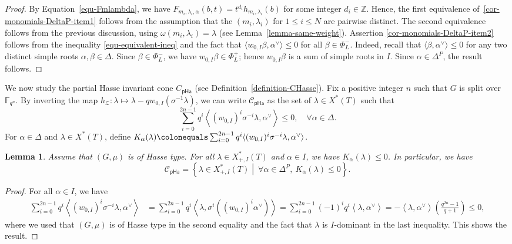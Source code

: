 \documentclass[11pt]{amsart}
\numberwithin{equation}{section}
\newtheorem{lemma}[theorem]{Lemma}
\theoremstyle{definition}
\theoremstyle{remark}
\newcommand{\pha}{\mathsf{pHa}}
\newcommand{\Ccal}{{\mathcal C}}
\newcommand{\Zcal}{{\mathcal Z}}
\newcommand{\FF}{\mathbb{F}}
\newcommand{\ZZ}{\mathbb{Z}}
\newcommand{\relmiddle}[1]{\mathrel{}\middle#1\mathrel{}}
\begin{document}
\begin{proof}
By Equation~\eqref{equ-Fmlambda}, we have $F_{m_i,\lambda_i,\alpha}(b,t)=t^{d_i} h_{m_i,\lambda_i}(b)$ for some integer $d_i\in \ZZ$. 
Hence, the first equivalence of~\eqref{cor-monomials-DeltaP-item1} follows from the assumption that the $(m_i,\lambda_i)$ for $1\leq i \leq N$ are pairwise distinct. 
The second equivalence follows from the previous discussion, using $\omega(m_i,\lambda_i)=\lambda$ (see Lemma~\ref{lemma-same-weight}). Assertion \eqref{cor-monomials-DeltaP-item2} follows from the inequality \eqref{equ-equivalent-ineq} and the fact that $\langle w_{0,I}\beta , \alpha^\vee \rangle \leq 0$ for all $\beta\in \Phi^{-}_{L}$. Indeed, recall that $\langle \beta,\alpha^\vee \rangle \leq 0$ for any two distinct simple roots $\alpha,\beta\in \Delta$. Since $\beta\in \Phi^{-}_{L}$, we have $w_{0,I}\beta\in \Phi^{+}_{L}$; hence $w_{0,I}\beta$ is a sum of simple roots in $I$. Since $\alpha\in \Delta^P$, the result follows.
\end{proof}


We now study the partial Hasse invariant cone $C_{\pha}$ (see Definition~\ref{definition-CHasse}). Fix a positive integer $n$ such that $G$ is split over $\FF_{q^n}$. By inverting the map $h_\Zcal\colon \lambda \mapsto \lambda -qw_{0,I}(\sigma^{-1}\lambda)$, we can write $\Ccal_{\pha}$ as the set of $\lambda\in X^*(T)$ such that
\begin{equation}\label{equ-CHasse}
\sum_{i=0}^{2n-1} q^i \left\langle (w_{0,I})^i \sigma^{-i} \lambda,\alpha^\vee \right\rangle \leq 0, \quad \forall \alpha \in \Delta.
\end{equation}
For $\alpha \in \Delta$ and $\lambda\in X^*(T)$, define $K_{\alpha}(\lambda) \colonequals \sum_{i=0}^{2n-1} q^i \langle (w_{0,I})^i \sigma^{-i} \lambda,\alpha^\vee \rangle$.

\begin{lemma}\label{lemma-HT-CHasse}
Assume that $(G,\mu)$ is of Hasse type. For all $\lambda\in X_{+,I}^*(T)$ and $\alpha\in I$, we have $K_\alpha(\lambda)\leq 0$. In particular, we have 
\begin{equation}
  \Ccal_{\pha}=\left\{\lambda\in X_{+,I}^*(T) \relmiddle| \ \forall \alpha \in \Delta^P, \ K_\alpha(\lambda)\leq 0 \right\}.
\end{equation}
\end{lemma}

\begin{proof}
For all $\alpha\in I$, we have
\begin{align}
\sum_{i=0}^{2n-1} q^i \left\langle (w_{0,I})^i \sigma^{-i} \lambda,\alpha^\vee \right\rangle & = \sum_{i=0}^{2n-1} q^i \left\langle  \lambda,\sigma^i((w_{0,I})^i \alpha^\vee) \right\rangle = \sum_{i=0}^{2n-1} (-1)^i q^i \left\langle  \lambda, \alpha^\vee \right\rangle
=-\left\langle  \lambda, \alpha^\vee \right\rangle \left(\frac{q^{2n}-1}{q+1} \right) \leq 0,
\end{align}
where we used that $(G,\mu)$ is of Hasse type in the second equality and the fact that $\lambda$ is $I$-dominant in the last inequality. 
This shows the result.
\end{proof}
\end{document}

